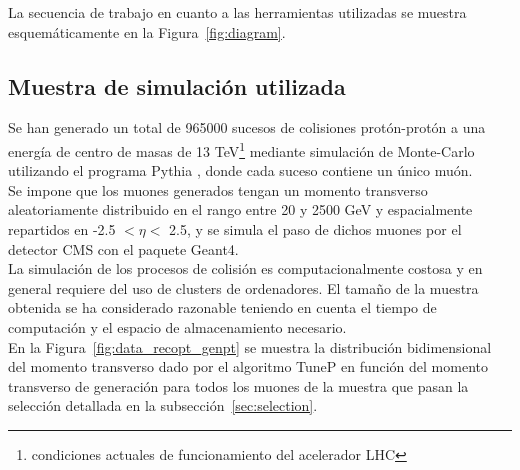 La secuencia de trabajo en cuanto a las herramientas utilizadas se muestra esquem\'aticamente en la Figura~\ref{fig:diagram}.

\begin{center}
\label{fig:diagram}        
\end{center}


\subsection{Muestra de simulaci\'on utilizada}\label{sec:sample}

Se han generado un total de 965000 sucesos de colisiones prot\'on-prot\'on a una energ\'ia de centro de masas de 13 TeV\footnote{condiciones actuales de funcionamiento del acelerador LHC} mediante simulaci\'on de Monte-Carlo utilizando el programa Pythia \cite{generator}, donde cada suceso contiene un \'unico mu\'on. \\
Se impone que los muones generados tengan un momento transverso aleatoriamente distribuido en el rango entre 20 y 2500 GeV y espacialmente repartidos en -2.5 $< \eta <$ 2.5, y se simula el paso de dichos muones por el detector CMS con el paquete Geant4. \\

La simulaci\'on de los procesos de colisi\'on es computacionalmente costosa y en general requiere del uso de clusters de ordenadores. El tama\~no de la muestra obtenida se ha considerado razonable teniendo en cuenta el tiempo de computaci\'on y el espacio de almacenamiento necesario. \\

En la Figura~\ref{fig:data_recopt_genpt} se muestra la distribuci\'on bidimensional del momento transverso dado por el algoritmo TuneP en funci\'on del momento transverso de generaci\'on para todos los muones de la muestra que pasan la selecci\'on detallada en la subsecci\'on~\ref{sec:selection}. \\

